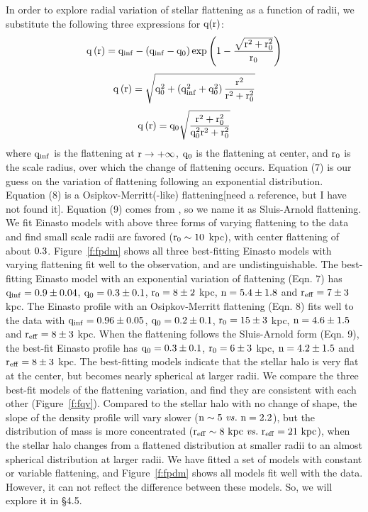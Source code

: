 \documentclass[12pt,preprint]{aastex}
\begin{document}
 In order to explore radial variation of stellar flattening as a function of radii, we substitute the following three expressions for $\rm q(r)$:
\begin{equation}
\rm q\left(r\right)=q_{inf}-\left(q_{inf}-q_0\right)exp\left(1-\frac{\sqrt{r^2+r_0^2}}{r_0}\right)
\end{equation}
\begin{equation}
\rm q\left(r\right)=\sqrt{q_0^2+\left(q_{inf}^2+q_0^2\right)\frac{r^2}{r^2+r_0^2}}
\end{equation}
\begin{equation}
\rm q\left(r\right)=q_0\sqrt{\frac{r^2+r_0^2}{q_0^2r^2+r_0^2}}
\end{equation}
where $\rm q_{inf}$ is the flattening at $\rm r\rightarrow+\infty$, $\rm q_0$ is the flattening at center, and $\rm r_0$ is the scale radius, over which the change of flattening occurs. Equation (7) is our guess on the variation of flattening following an exponential distribution. Equation (8) is a Osipkov-Merritt(-like) flattening[need a reference, but I have not found it]. Equation (9) comes from \citet{Sluis1998}, so we name it as Sluis-Arnold flattening. We fit Einasto models with above three forms of varying flattening to the data and find small scale radii are favored ($\rm r_0 \sim 10~$kpc), with center flattening of about $\rm 0.3$. Figure~\ref{f:fpdm} shows all three best-fitting Einasto models with varying flattening fit well to the observation, and are undistinguishable. The best-fitting Einasto model with an exponential variation of flattening (Eqn. 7) has $\rm q_{inf}=0.9\pm0.04$, $\rm q_0=0.3\pm0.1$, $\rm r_0=8\pm2~$kpc, $\rm n=5.4\pm1.8$ and $\rm r_{eff}=7\pm3~$kpc. The Einasto profile with an Osipkov-Merritt flattening (Eqn. 8) fits well to the data with $\rm q_{inf}=0.96\pm0.05$, $\rm q_0=0.2\pm0.1$, $\rm r_0=15\pm3~$kpc, $\rm n=4.6\pm1.5$ and $\rm r_{eff}=8\pm3~$kpc. When the flattening follows the Sluis-Arnold form (Eqn. 9), the best-fit Einasto profile has $\rm q_0=0.3\pm0.1$, $\rm r_0=6\pm3~$kpc, $\rm n=4.2\pm1.5$ and $\rm r_{eff}=8\pm3~$kpc. The best-fitting models indicate that the stellar halo is very flat at the center, but becomes nearly spherical at larger radii. We compare the three best-fit models of the flattening variation, and find they are consistent with each other (Figure~\ref{f:fqv}). Compared to the stellar halo with no change of shape, the slope of the density profile will vary slower ($\rm n\sim5~ \it{vs.} \rm ~n=2.2$), but the distribution of mass is more concentrated ($\rm r_{eff}\sim8~kpc~ \it{vs.}~ \rm r_{eff}=21~kpc$), when the stellar halo changes from a flattened distribution at smaller radii to an almost spherical distribution at larger radii.
We have fitted a set of models with constant or variable flattening, and Figure~\ref{f:fpdm} shows all models fit well with the data. However, it can not reflect the difference between these models. So, we will explore it in \S 4.5.
\end{document}
